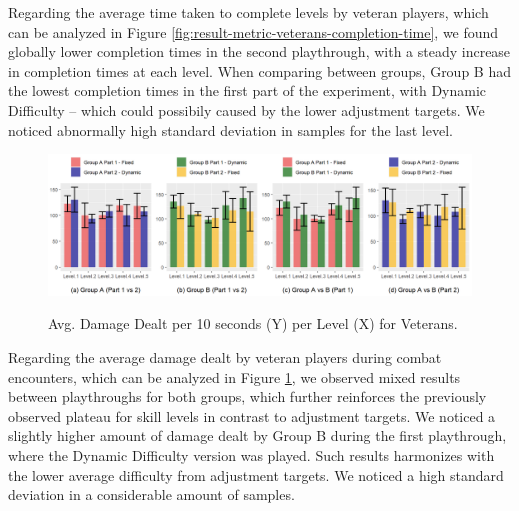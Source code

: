 Regarding the average time taken to complete levels by veteran players, which can be analyzed in Figure \ref{fig:result-metric-veterans-completion-time}, we found globally lower completion times in the second playthrough, with a steady increase in completion times at each level. When comparing between groups, Group B had the lowest completion times in the first part of the experiment, with Dynamic Difficulty -- which could possibily caused by the lower adjustment targets. We noticed abnormally high standard deviation in samples for the last level.

\begin{figure}[!ht]
    \begin{center}
    \caption{Avg. Damage Dealt per 10 seconds (Y) per Level (X) for Veterans.}
        \includegraphics[width=\textwidth]{figures/damage_dealt_per_10s-veteran_players.png}
        \label{fig:result-metric-veterans-damage-dealt-per-10s}
    \end{center}
\end{figure}

Regarding the average damage dealt by veteran players during combat encounters, which can be analyzed in Figure \ref{fig:result-metric-veterans-damage-dealt-per-10s}, we observed mixed results between playthroughs for both groups, which further reinforces the previously observed plateau for skill levels in contrast to adjustment targets. We noticed a slightly higher amount of damage dealt by Group B during the first playthrough, where the Dynamic Difficulty version was played. Such results harmonizes with the lower average difficulty from adjustment targets. We noticed a high standard deviation in a considerable amount of samples.

